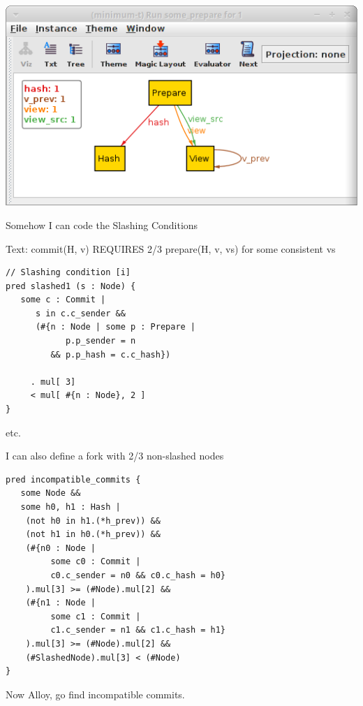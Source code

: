 \documentclass{beamer}
\begin{document}
\begin{frame}
\includegraphics[width=\textwidth]{circle.png}
\end{frame}

\begin{frame}[fragile]{Somehow I can code the Slashing Conditions}

Text: commit(H, v) REQUIRES 2/3 prepare(H, v, vs) for some consistent vs

\begin{verbatim}
// Slashing condition [i]
pred slashed1 (s : Node) {
   some c : Commit |
      s in c.c_sender &&
      (#{n : Node | some p : Prepare |
            p.p_sender = n
         && p.p_hash = c.c_hash})

     . mul[ 3]
     < mul[ #{n : Node}, 2 ]
}
\end{verbatim}

etc.
\end{frame}

\begin{frame}[fragile]{I can also define a fork with 2/3 non-slashed nodes}

\begin{verbatim}
pred incompatible_commits {
   some Node &&
   some h0, h1 : Hash |
    (not h0 in h1.(*h_prev)) &&
    (not h1 in h0.(*h_prev)) &&
    (#{n0 : Node |
         some c0 : Commit |
         c0.c_sender = n0 && c0.c_hash = h0}
    ).mul[3] >= (#Node).mul[2] &&
    (#{n1 : Node |
         some c1 : Commit |
         c1.c_sender = n1 && c1.c_hash = h1}
    ).mul[3] >= (#Node).mul[2] &&
    (#SlashedNode).mul[3] < (#Node)
}
\end{verbatim}

Now Alloy, go find incompatible commits.
\end{frame}
\end{document}
